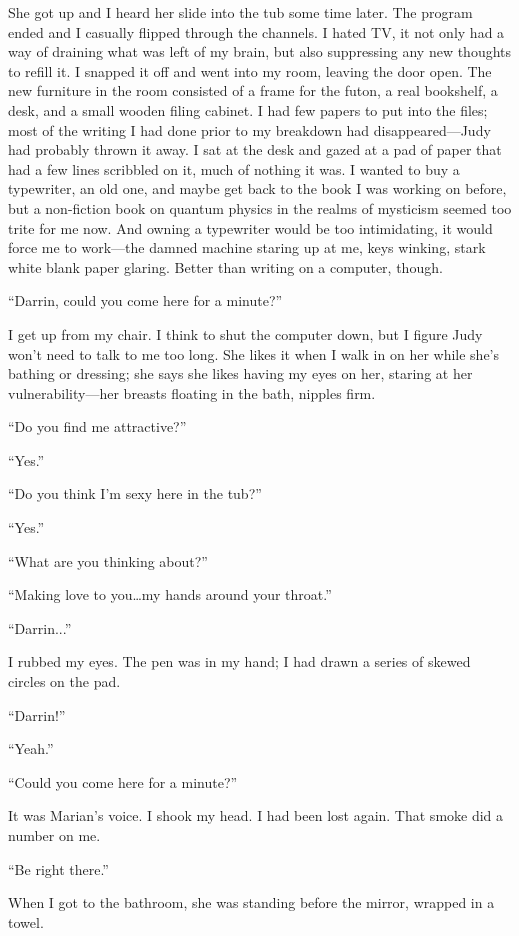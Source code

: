 She got up and I heard her slide into the tub some time later. The
program ended and I casually flipped through the channels. I hated TV,
it not only had a way of draining what was left of my brain, but also
suppressing any new thoughts to refill it. I snapped it off and went
into my room, leaving the door open. The new furniture in the room
consisted of a frame for the futon, a real bookshelf, a desk, and a
small wooden filing cabinet. I had few papers to put into the files;
most of the writing I had done prior to my breakdown had
disappeared---Judy had probably thrown it away. I sat at the desk and
gazed at a pad of paper that had a few lines scribbled on it, much of
nothing it was. I wanted to buy a typewriter, an old one, and maybe get
back to the book I was working on before, but a non-fiction book on
quantum physics in the realms of mysticism seemed too trite for me now.
And owning a typewriter would be too intimidating, it would force me to
work---the damned machine staring up at me, keys winking, stark white
blank paper glaring. Better than writing on a computer, though.

``Darrin, could you come here for a minute?''

I get up from my chair. I think to shut the computer down, but I figure
Judy won't need to talk to me too long. She likes it when I walk in on
her while she's bathing or dressing; she says she likes having my eyes
on her, staring at her vulnerability---her breasts floating in the bath,
nipples firm.

``Do you find me attractive?''

``Yes.''

``Do you think I'm sexy here in the tub?''

``Yes.''

``What are you thinking about?''

``Making love to you\ldots my hands around your throat.''

``Darrin...''

I rubbed my eyes. The pen was in my hand; I had drawn a series of skewed
circles on the pad.

``Darrin!''

``Yeah.''

``Could you come here for a minute?''

It was Marian's voice. I shook my head. I had been lost again. That
smoke did a number on me.

``Be right there.''

When I got to the bathroom, she was standing before the mirror, wrapped
in a towel.

